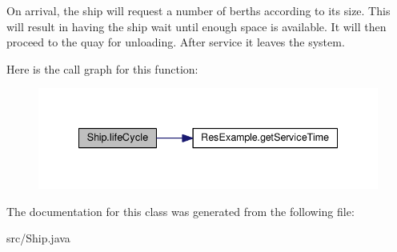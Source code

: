On arrival, the ship will request a number of berths according to its size. This will result in having the ship wait until enough space is available. It will then proceed to the quay for unloading. After service it leaves the system. 

Here is the call graph for this function\-:
\nopagebreak
\begin{figure}[H]
\begin{center}
\leavevmode
\includegraphics[width=338pt]{class_ship_a553ad1866574241a0d48d80cbdb7cf21_cgraph}
\end{center}
\end{figure}




The documentation for this class was generated from the following file\-:\begin{DoxyCompactItemize}
\item 
src/Ship.\-java\end{DoxyCompactItemize}
